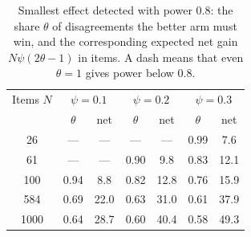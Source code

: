\begin{table}[ht]
\centering\small
\begin{tabular}{ccccccc}
\toprule
Items $N$ & \multicolumn{2}{c}{$\psi=0.1$} & \multicolumn{2}{c}{$\psi=0.2$} & \multicolumn{2}{c}{$\psi=0.3$}\\
 & $\theta$ & net & $\theta$ & net & $\theta$ & net\\
\midrule
26 & --- & --- & --- & --- & 0.99 & 7.6\\
61 & --- & --- & 0.90 & 9.8 & 0.83 & 12.1\\
100 & 0.94 & 8.8 & 0.82 & 12.8 & 0.76 & 15.9\\
584 & 0.69 & 22.0 & 0.63 & 31.0 & 0.61 & 37.9\\
1000 & 0.64 & 28.7 & 0.60 & 40.4 & 0.58 & 49.3\\
\bottomrule
\end{tabular}
\caption{Smallest effect detected with power $0.8$: the share $\theta$ of disagreements the better arm must win, and the corresponding expected net gain $N\psi(2\theta-1)$ in items. A dash means that even $\theta=1$ gives power below $0.8$.}
\label{tab:mcnemar-mdd}
\end{table}

